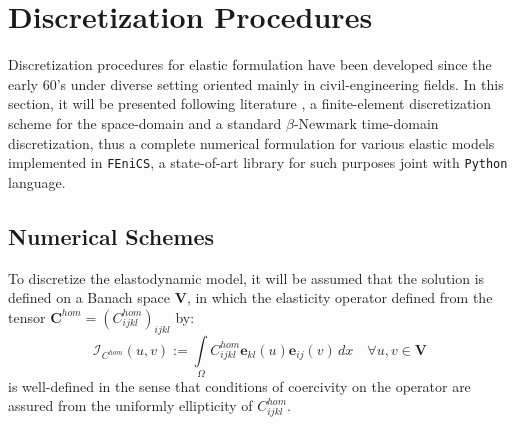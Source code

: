 \chapter{Discretization Procedures}

Discretization procedures for elastic formulation have been developed since the early $60$'s under diverse setting oriented mainly in civil-engineering fields. In this section, it will be presented following literature  \cite{ern2004theory}, \cite{raviart1983introduction} a finite-element discretization scheme for the space-domain and a standard $\beta$-Newmark time-domain discretization, thus a complete numerical formulation for various elastic models implemented in \texttt{FEniCS}, a state-of-art library for such purposes joint with \texttt{Python} language.

\section{Numerical Schemes}
To discretize the elastodynamic model, it will be assumed that the solution is defined on a Banach space $\mathbf{V}$, in which the elasticity operator defined from the tensor $\mathbf{C}^{hom} = (C^{hom}_{ijkl})_{ijkl}$ by:
\begin{equation*}
    \mathcal{I}_{C^{hom}} (u,v) := \int \limits_{\Omega} C^{hom}_{ijkl}\mathbf{e}_{kl}(u) \mathbf{e}_{ij}(v) \, dx \quad \forall u,v \in \mathbf{V}
\end{equation*}
is well-defined in the sense that conditions of coercivity on the operator are assured from the uniformly ellipticity of $C^{hom}_{ijkl}$.

